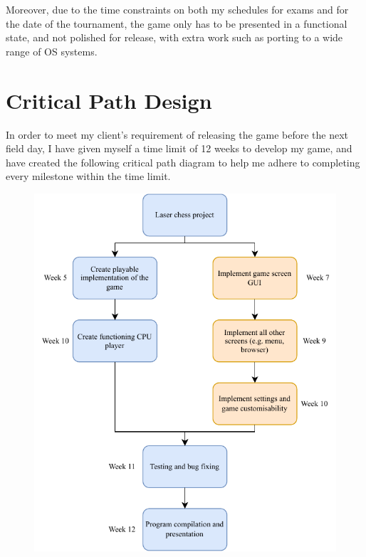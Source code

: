 \documentclass[../main/main.tex]{subfiles}
\begin{document}
Moreover, due to the time constraints on both my schedules for exams and for the date of the tournament, the game only has to be presented in a functional state, and not polished for release, with extra work such as porting to a wide range of OS systems.

\section{Critical Path Design}
In order to meet my client’s requirement of releasing the game before the next field day, I have given myself a time limit of 12 weeks to develop my game, and have created the following critical path diagram to help me adhere to completing every milestone within the time limit.

\begin{figure}[H]
    \centering
    \includegraphics[width=\columnwidth]{../analysis/assets/critical_path_diagram.pdf}
    \label{fig:critical-path-diagram}
\end{figure}
\end{document}
